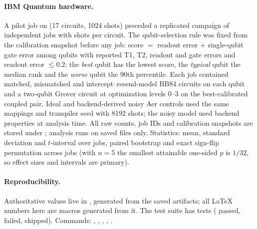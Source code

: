 \paragraph{IBM Quantum hardware.} A pilot job on \HwBackend{} (17 circuits, 1024 shots) preceded a replicated campaign of \HwJobs{} independent jobs with \HwShots{} shots per circuit. The qubit-selection rule was fixed from the calibration snapshot before any job: score $=$ readout error $+$ single-qubit gate error among qubits with reported T1, T2, readout and gate errors and readout error $\le 0.2$; the \emph{best} qubit has the lowest score, the \emph{typical} qubit the median rank and the \emph{worse} qubit the 90th percentile. Each job contained matched, mismatched and intercept--resend-model BB84 circuits on each qubit and a two-qubit Grover circuit at optimization levels 0--3 on the best-calibrated coupled pair. Ideal and backend-derived noisy Aer controls used the same mappings and transpiler seed with 8192 shots; the noisy model used backend properties at analysis time. All raw counts, job IDs and calibration snapshots are stored under ; analysis runs on saved files only. Statistics: mean, standard deviation and $t$-interval over jobs, paired bootstrap and exact sign-flip permutation across jobs (with $n=5$ the smallest attainable one-sided $p$ is $1/32$, so effect sizes and intervals are primary).

\paragraph{Reproducibility.} Authoritative values live in , generated from the saved artifacts; all LaTeX numbers here are macros generated from it. The test suite has \TestsTotal{} tests (\TestsPassed{} passed, \TestsFailed{} failed, \TestsSkipped{} skipped). Commands: , , , , .
